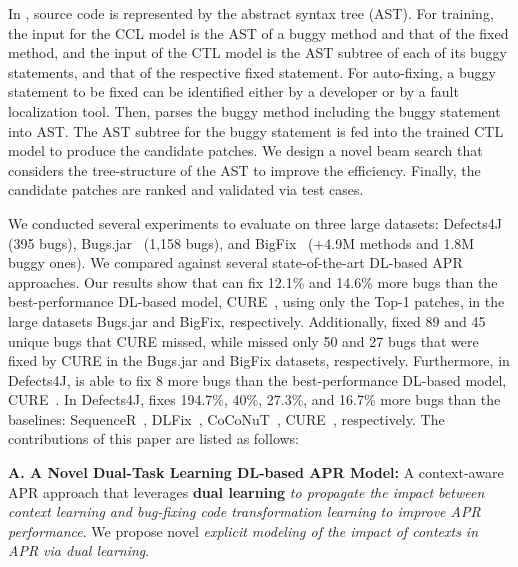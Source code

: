 In {\tool}, source code is represented by the abstract syntax tree
(AST). For training, the input for the CCL model is the AST of a buggy
method and that of the fixed method, and the input of the CTL model is
the AST subtree of each of its buggy statements, and that of the
respective fixed statement. For auto-fixing, a buggy statement to be
fixed can be identified either by a developer or by a fault
localization tool.  Then, {\tool} parses the buggy method including
the buggy statement into AST. The AST subtree for the buggy statement
is fed into the trained CTL model to produce the candidate patches. We
design a novel beam search that considers the tree-structure of the
AST to improve the efficiency. Finally, the candidate patches are
ranked and validated via test cases.

We conducted several experiments to evaluate {\tool} on three large
datasets: Defects4J~\cite{defects4j} (395 bugs),
Bugs.jar~\cite{saha2018bugs} (1,158 bugs), and
BigFix~\cite{yioopsla19} (+4.9M methods and 1.8M buggy ones).  We
compared {\tool} against several state-of-the-art DL-based APR
approaches.  Our results show that {\tool} can fix 12.1\% and 14.6\%
more bugs than the best-performance DL-based model,
CURE~\cite{cure-icse21}, using only the Top-1 patches, in the large
datasets Bugs.jar and BigFix, respectively. Additionally, {\tool}
fixed 89 and 45 unique bugs that CURE missed, while {\tool} missed
only 50 and 27 bugs that were fixed by CURE in the Bugs.jar and BigFix
datasets, respectively.  Furthermore, in Defects4J, {\tool} is able to
fix 8 more bugs than the best-performance DL-based model,
CURE~\cite{cure-icse21}.
In Defects4J, {\tool} fixes 194.7\%, 40\%, 27.3\%, and 16.7\% more
bugs than the baselines: SequenceR~\cite{chen2018sequencer},
DLFix~\cite{li2020dlfix}, CoCoNuT~\cite{lutellier2020coconut},
CURE~\cite{cure-icse21}, respectively. The contributions of
this paper are listed as follows:


{\bf A. A Novel Dual-Task Learning DL-based APR Model:} A
context-aware APR approach that leverages {\bf dual learning}
{\em to propagate the impact between context learning and
  bug-fixing code transformation learning to improve APR
  performance}. We propose novel {\em explicit modeling of the impact of
contexts in APR via dual learning}.

